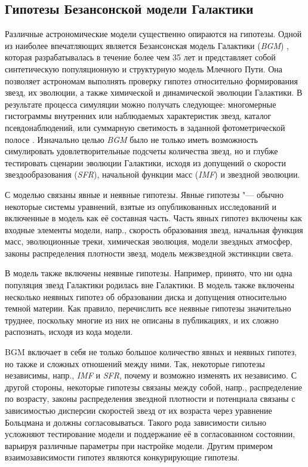 \subsection{Гипотезы Безансонской модели Галактики}
Различные астрономические модели существенно опираются на гипотезы. Одной из наиболее впечатляющих является 
Безансонская модель Галактики (\textit{BGM}) \cite{czekaj2014besanccon, robin2003synthetic}, которая разрабатывалась 
в течение более чем 35 лет и представляет собой синтетическую популяционную и структурную модель Млечного Пути. 
Она позволяет астрономам выполнять проверку гипотез относительно формирования звезд, их эволюции, а также химической 
и динамической эволюции Галактики. В результате процесса симуляции можно получать следующее: многомерные гистограммы 
внутренних или наблюдаемых характеристик звезд, каталог псевдонаблюдений, или суммарную светимость в заданной 
фотометрической полосе \cite{czekaj2012galaxy}. Изначально целью \textit{BGM} было не только иметь возможность 
симулировать удовлетворительные подсчеты количества звезд, но и глубже тестировать сценарии эволюции Галактики, 
исходя из допущений о скорости звездообразования (\textit{SFR}), начальной функции масс 
(\textit{IMF}) и звездной эволюции.

С моделью связаны явные и неявные гипотезы. Явные гипотезы "--- обычно некоторые системы уравнений, взятые из 
опубликованных исследований и включенные в модель как её составная часть. Часть явных гипотез включены как входные 
элементы модели, напр., скорость образования звезд, начальная функция масс, эволюционные треки, химическая эволюция, 
модели звездных атмосфер, законы распределения плотности звезд, модель межзвездной экстинкции света.

В модель также включены неявные гипотезы. Например, принято, что ни одна популяция звезд Галактики родилась вне 
Галактики. В модель также включены несколько неявных гипотез об образовании диска и допущения относительно темной 
материи. Как правило, перечислить все неявные гипотезы значительно труднее, поскольку многие из них не описаны в 
публикациях, и их сложно распознать, исходя из кода модели.

BGM включает в себя не только большое количество явных и неявных гипотез, но также и сложных отношений между ними. 
Так, некоторые гипотезы независимы, напр., \textit{IMF} и \textit{SFR}, почему и возможно изменять их независимо. 
С другой стороны, некоторые гипотезы связаны между собой, напр., распределение по возрасту, законы распределения 
звездной плотности и потенциала связаны с зависимостью дисперсии скоростей звезд от их возраста через уравнение 
Больцмана и должны согласовываться. Такого рода зависимости сильно усложняют тестирование модели и поддержание 
её в согласованном состоянии, варьируя различные параметры при настройке модели. Другим примером взаимозависимости 
гипотез являются конкурирующие гипотезы.


